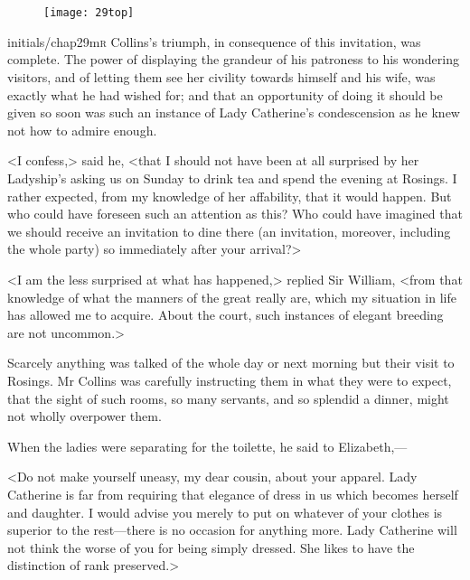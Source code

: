 \chapter[Chapter \thechapter]{}
	
\begin{figure}[t!]
\centering
\texttt{[image: 29top]}
\end{figure}


\lettrine[lines=6,image=true]{initials/chap29m}{r}  Collins's triumph, in consequence of this invitation, was complete. The power of displaying the grandeur of his patroness to his wondering visitors, and of letting them see her civility towards himself and his wife, was exactly what he had wished for; and that an opportunity of doing it should be given so soon was such an instance of Lady Catherine's condescension as he knew not how to admire enough.

<I confess,> said he, <that I should not have been at all surprised by her Ladyship's asking us on Sunday to drink tea and spend the evening at Rosings. I rather expected, from my knowledge of her affability, that it would happen. But who could have foreseen such an attention as this? Who could have imagined that we should receive an invitation to dine there (an invitation, moreover, including the whole party) so immediately after your arrival?>

<I am the less surprised at what has happened,> replied Sir William, <from that knowledge of what the manners of the great really are, which my situation in life has allowed me to acquire. About the court, such instances of elegant breeding are not uncommon.>

Scarcely anything was talked of the whole day or next morning but their visit to Rosings. Mr Collins was carefully instructing them in what they were to expect, that the sight of such rooms, so many servants, and so splendid a dinner, might not wholly overpower them.

When the ladies were separating for the toilette, he said to Eliz\-a\-beth,—

<Do not make yourself uneasy, my dear cousin, about your apparel. Lady Catherine is far from requiring that elegance of dress in us which becomes herself and daughter. I would advise you merely to put on whatever of your clothes is superior to the rest—there is no occasion for anything more. Lady Catherine will not think the worse of you for being simply dressed. She likes to have the distinction of rank preserved.>

